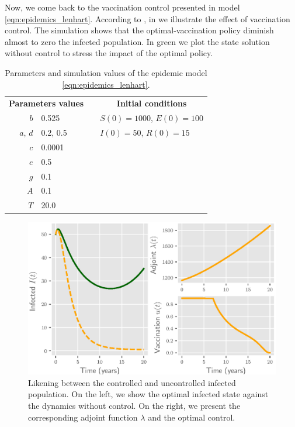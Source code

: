 Now, we come back to the vaccination control presented in model
\eqref{eqn:epidemics_lenhart}. According to ,
in  we illustrate the effect of vaccination 
control. The simulation shows that the optimal-vaccination policy diminish
almost to zero the infected population. In green we plot the state 
solution without control to stress the impact of the optimal policy.
\begin{table}[H]
  \begin{center}
    \begin{tabular}{rlll}
      \toprule
      \multicolumn{2}{c}{
            \textbf{Parameters values}
         }
        && \multicolumn{1}{c}{
          \textbf{Initial conditions}
        }
        \\
        \cmidrule{1-2}
        \cmidrule{4-4}
        $b$
          & \num{0.525}
          &&
          $S(0) = \num{1000}$, $E(0) = \num{100}$
        \\
        $a$, $d$ 
          & \num{0.2}, \num{0.5}
          &&
          $I(0) = \num{50}$, $R(0) = \num{15}$
        \\
        $c$
          & \num{0.0001}
        \\
        $e$
          & \num{0.5}
        \\
        $g$
          & \num{0.1}
        \\
        $A$
          & \num{0.1}
        \\
        $T$
          & \num{20.0}
        \\
      \bottomrule
    \end{tabular}
    \caption{Parameters and simulation values of the epidemic model
      \eqref{eqn:epidemics_lenhart}.}
    \label{tbl:epidemics_lenhart}
  \end{center}
\end{table}

\begin{figure}[H]
\centering
	\includegraphics{./Figures/epidemics_lenhart_lab7}
	\caption{Likening between the controlled and uncontrolled infected 
	 population.  On the left, we show the optimal infected state against the 
	 dynamics without control. On the right, we present the corresponding adjoint 
	 function $\lambda$ and the optimal control.}
  \label{fig:epidemicslenhartlab7}
\end{figure}
